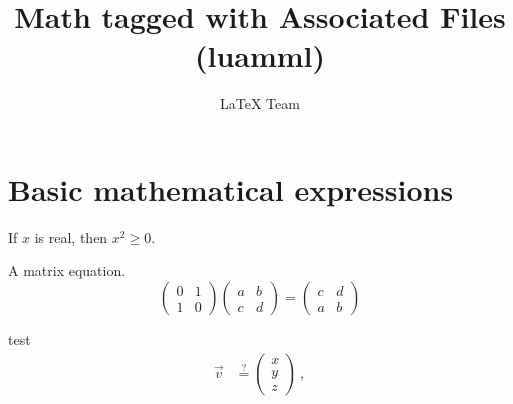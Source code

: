 \documentclass{article}
\title{Math tagged with Associated Files (luamml)}
\author{LaTeX Team}
\begin{document}
\maketitle

\section{Basic mathematical expressions}

If $x$ is real, then $x^{2} \geq 0$.

A matrix equation.
\[
\begin{pmatrix}0&1\\1&0\end{pmatrix}
\begin{pmatrix}a&b\\c&d\end{pmatrix}
=
\begin{pmatrix}c&d\\a&b\end{pmatrix}
\]

test
\begin{align}
    \vec{v} 
    &\stackrel{?}{=} 
    \begin{pmatrix}
        x
        \\
        y
        \\
        z
    \end{pmatrix} \ ,
\end{align}
\end{document}
